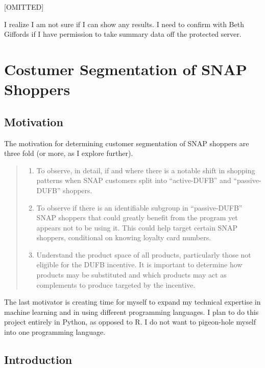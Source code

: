 \documentclass[12pt,letterpaperpaper,]{book}
\providecommand{\tightlist}{%
  \setlength{\itemsep}{0pt}\setlength{\parskip}{0pt}}
\begin{document}
{[}OMITTED{]}

I realize I am not sure if I can show any results. I need to confirm
with Beth Giffords if I have permission to take summary data off the
protected server.

\chapter{Costumer Segmentation of SNAP
Shoppers}\label{costumer-segmentation-of-snap-shoppers}

\section*{Motivation}\label{motivation}

The motivation for determining customer segmentation of SNAP shoppers
are three fold (or more, as I explore further).

\begin{quote}
\begin{enumerate}
\def\labelenumi{\arabic{enumi}.}
\tightlist
\item
  To observe, in detail, if and where there is a notable shift in
  shopping patterns when SNAP customers split into ``active-DUFB'' and
  ``passive-DUFB'' shoppers.
\item
  To observe if there is an identifiable subgroup in ``passive-DUFB''
  SNAP shoppers that could greatly benefit from the program yet appears
  not to be using it. This could help target certain SNAP shoppers,
  conditional on knowing loyalty card numbers.
\item
  Understand the product space of all products, particularly those not
  eligible for the DUFB incentive. It is important to determine how
  products may be substituted and which products may act as complements
  to produce targeted by the incentive.
\end{enumerate}
\end{quote}

The last motivator is creating time for myself to expand my technical
expertise in machine learning and in using different programming
languages. I plan to do this project entirely in Python, as opposed to
R. I do not want to pigeon-hole myself into one programming language.

\section*{Introduction}\label{introduction}
\end{document}
